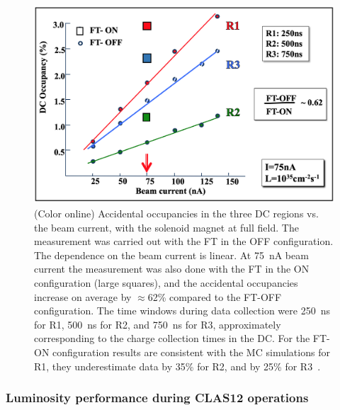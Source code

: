 \documentclass[final,3p,twocolumn]{elsarticle}
\begin{document}
\begin{figure}[htbp!]
\centerline{\includegraphics[width=1.0\columnwidth]{random-occupancies.png}}
\caption{(Color online) Accidental occupancies in the three DC regions vs. the beam current, with the solenoid magnet at full field.
  The measurement was carried out with the FT in the OFF configuration. The dependence on the beam
  current is linear. At 75~nA beam current the measurement was also done with the FT in the ON configuration (large
  squares), and the accidental occupancies increase on average by $\approx$62\% compared to the FT-OFF configuration. 
  The time windows during data
  collection were 250~ns for R1, 500~ns for R2, and 750~ns for R3, approximately corresponding to the charge
  collection times in the DC. For the FT-ON configuration results are consistent with the MC simulations for R1, they underestimate data by 35\% for 
  R2, and by 25\% for R3~\cite{GEMC,GEMC-background}. }
\label{occupancies1}
\end{figure}

\subsubsection{Luminosity performance during CLAS12 operations}
\end{document}
